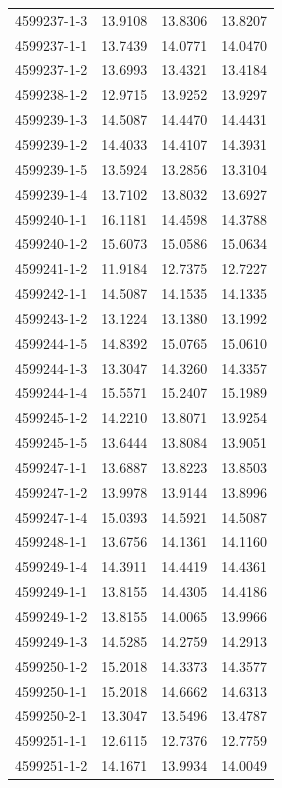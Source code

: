 \begin{longtable}{lrrr}
4599237-1-3 & 13.9108 & 13.8306 & 13.8207 \\
4599237-1-1 & 13.7439 & 14.0771 & 14.0470 \\
4599237-1-2 & 13.6993 & 13.4321 & 13.4184 \\
4599238-1-2 & 12.9715 & 13.9252 & 13.9297 \\
4599239-1-3 & 14.5087 & 14.4470 & 14.4431 \\
4599239-1-2 & 14.4033 & 14.4107 & 14.3931 \\
4599239-1-5 & 13.5924 & 13.2856 & 13.3104 \\
4599239-1-4 & 13.7102 & 13.8032 & 13.6927 \\
4599240-1-1 & 16.1181 & 14.4598 & 14.3788 \\
4599240-1-2 & 15.6073 & 15.0586 & 15.0634 \\
4599241-1-2 & 11.9184 & 12.7375 & 12.7227 \\
4599242-1-1 & 14.5087 & 14.1535 & 14.1335 \\
4599243-1-2 & 13.1224 & 13.1380 & 13.1992 \\
4599244-1-5 & 14.8392 & 15.0765 & 15.0610 \\
4599244-1-3 & 13.3047 & 14.3260 & 14.3357 \\
4599244-1-4 & 15.5571 & 15.2407 & 15.1989 \\
4599245-1-2 & 14.2210 & 13.8071 & 13.9254 \\
4599245-1-5 & 13.6444 & 13.8084 & 13.9051 \\
4599247-1-1 & 13.6887 & 13.8223 & 13.8503 \\
4599247-1-2 & 13.9978 & 13.9144 & 13.8996 \\
4599247-1-4 & 15.0393 & 14.5921 & 14.5087 \\
4599248-1-1 & 13.6756 & 14.1361 & 14.1160 \\
4599249-1-4 & 14.3911 & 14.4419 & 14.4361 \\
4599249-1-1 & 13.8155 & 14.4305 & 14.4186 \\
4599249-1-2 & 13.8155 & 14.0065 & 13.9966 \\
4599249-1-3 & 14.5285 & 14.2759 & 14.2913 \\
4599250-1-2 & 15.2018 & 14.3373 & 14.3577 \\
4599250-1-1 & 15.2018 & 14.6662 & 14.6313 \\
4599250-2-1 & 13.3047 & 13.5496 & 13.4787 \\
4599251-1-1 & 12.6115 & 12.7376 & 12.7759 \\
4599251-1-2 & 14.1671 & 13.9934 & 14.0049 \\

\end{longtable}
